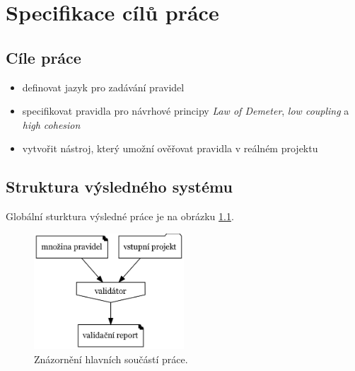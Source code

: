 \chapter{Specifikace cílů práce}



\section{Cíle práce}
\begin{itemize}
\item definovat jazyk pro zadávání pravidel
\item specifikovat pravidla pro návrhové principy \emph{Law of Demeter}, \emph{low coupling} a \emph{high cohesion}
\item vytvořit nástroj, který umožní ověřovat pravidla v reálném projektu
\end{itemize}

\section{Struktura výsledného systému}
Globální sturktura výsledné práce je na obrázku \ref{global_structure}.

\begin{figure}[h!]
  \centering
  \includegraphics[width=0.5\textwidth]{./graphs/global_structure.png}
  \caption{Znázornění hlavních součástí práce.\label{global_structure}}
\end{figure}

